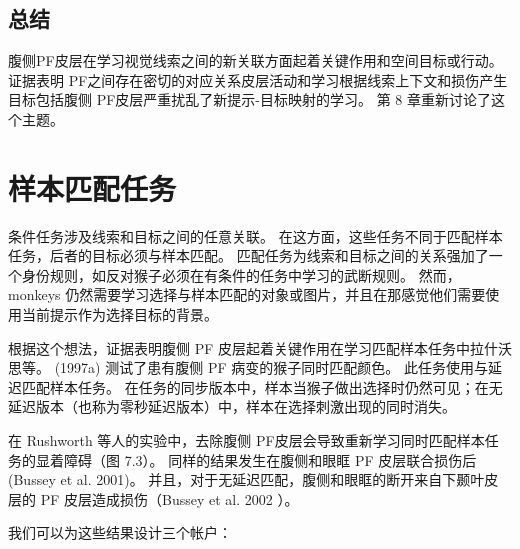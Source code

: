 \subsection{总结}
腹侧PF皮层在学习视觉线索之间的新关联方面起着关键作用和空间目标或行动。
证据表明 PF之间存在密切的对应关系皮层活动和学习根据线索上下文和损伤产生目标包括腹侧 PF皮层严重扰乱了新提示-目标映射的学习。
第 8 章重新讨论了这个主题。
\section{样本匹配任务}
\par
条件任务涉及线索和目标之间的任意关联。 
在这方面，这些任务不同于匹配样本任务，后者的目标必须与样本匹配。
匹配任务为线索和目标之间的关系强加了一个身份规则，如反对猴子必须在有条件的任务中学习的武断规则。 
然而，monkeys 仍然需要学习选择与样本匹配的对象或图片，并且在那感觉他们需要使用当前提示作为选择目标的背景。
\par
根据这个想法，证据表明腹侧 PF 皮层起着关键作用在学习匹配样本任务中拉什沃思等。 (1997a) 测试了患有腹侧 PF 病变的猴子同时匹配颜色。 
此任务使用与延迟匹配样本任务。 
在任务的同步版本中，样本当猴子做出选择时仍然可见；在无延迟版本（也称为零秒延迟版本）中，样本在选择刺激出现的同时消失。
\par
在 Rushworth 等人的实验中，去除腹侧 PF皮层会导致重新学习同时匹配样本任务的显着障碍（图 7.3）。
同样的结果发生在腹侧和眼眶 PF 皮层联合损伤后(Bussey et al. 2001)。
并且，对于无延迟匹配，腹侧和眼眶的断开来自下颞叶皮层的 PF 皮层造成损伤（Bussey et al. 2002 ）。
\par
我们可以为这些结果设计三个帐户：
